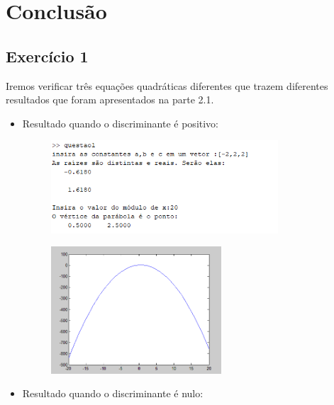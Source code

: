 \documentclass[12pt]{article}
\begin{document}
\pagebreak
\section{Conclusão}

\subsection{Exercício 1}

Iremos verificar três equações quadráticas diferentes que trazem diferentes resultados que foram apresentados na parte 2.1.

\begin{itemize}
    \item Resultado quando o discriminante é positivo:
    
    \begin{figure}[H]
        \begin{center}
            \includegraphics[width=0.8\textwidth]{outputq1-3.png}
        \end{center}
    \end{figure}
    \begin{figure}[H]
        \begin{center}
            \includegraphics[width=0.6\textwidth]{graficoq1-3.png}
        \end{center}
    \end{figure}

    \item Resultado quando o discriminante é nulo:
    

\end{itemize}
\end{document}
